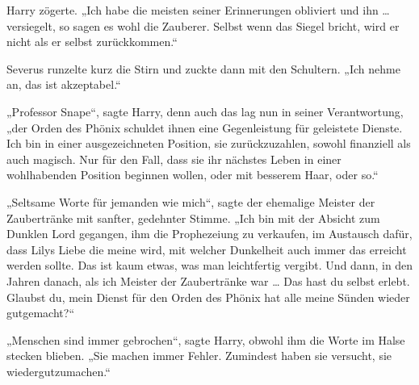 Harry zögerte.
„Ich habe die meisten seiner Erinnerungen obliviert und ihn … versiegelt, so sagen es wohl die Zauberer. Selbst wenn das Siegel bricht, wird er nicht als er selbst zurückkommen.“

Severus runzelte kurz die Stirn und zuckte dann mit den Schultern.
„Ich nehme an, das ist akzeptabel.“

„Professor Snape“, sagte Harry, denn auch das lag nun in seiner Verantwortung, „der Orden des Phönix schuldet ihnen eine Gegenleistung für geleistete Dienste. Ich bin in einer ausgezeichneten Position, sie zurückzuzahlen, sowohl finanziell als auch magisch. Nur für den Fall, dass sie ihr nächstes Leben in einer wohlhabenden Position beginnen wollen, oder mit besserem Haar, oder so.“

„Seltsame Worte für jemanden wie mich“, sagte der ehemalige Meister der Zaubertränke mit sanfter, gedehnter Stimme.
„Ich bin mit der Absicht zum Dunklen Lord gegangen, ihm die Prophezeiung zu verkaufen, im Austausch dafür, dass Lilys Liebe die meine wird, mit welcher Dunkelheit auch immer das erreicht werden sollte. Das ist kaum etwas, was man leichtfertig vergibt. Und dann, in den Jahren danach, als ich Meister der Zaubertränke war … Das hast du selbst erlebt. Glaubst du, mein Dienst für den Orden des Phönix hat alle meine Sünden wieder gutgemacht?“

„Menschen sind immer gebrochen“, sagte Harry, obwohl ihm die Worte im Halse stecken blieben.
„Sie machen immer Fehler. Zumindest haben sie versucht, sie wiedergutzumachen.“


